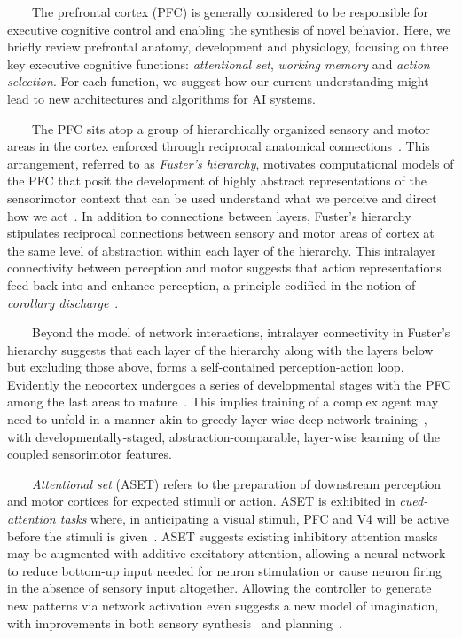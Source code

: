 \documentclass[letterpaper,11pt]{article}
\begin{document}
\begin{center}
  \begin{tcolorbox}[breakable,sharp corners=all,coltitle=black,colbacktitle=white,
    width=\textwidth,boxsep=5pt,left=5pt,right=5pt,
    title={\textbf{Box C: Hierarchy, Abstraction and Executive Control}}]
    
~~~~The prefrontal cortex (PFC) is generally considered to be responsible for executive cognitive control and enabling the synthesis of novel behavior. Here, we briefly review prefrontal anatomy, development and physiology, focusing on three key executive cognitive functions: {\it{attentional set}}, {\it{working memory}} and {\it{action selection}}. For each function, we suggest how our current understanding might lead to new architectures and algorithms for AI systems.

~~~~The PFC sits atop a group of hierarchically organized sensory and motor areas in the cortex enforced through reciprocal anatomical connections~\cite{FusterPREFRONTAL-CORTEX-15}. This arrangement, referred to as {\it{Fuster’s hierarchy}}, motivates computational models of the PFC that posit the development of highly abstract representations of the sensorimotor context that can be used understand what we perceive and direct how we act~\cite{BotvinickPTRS_B-07}. In addition to connections between layers, Fuster’s hierarchy stipulates reciprocal connections between sensory and motor areas of cortex at the same level of abstraction within each layer of the hierarchy. This intralayer connectivity between perception and motor suggests that action representations feed back into and enhance perception, a principle codified in the notion of {\it{corollary discharge}}~\cite{mccloskey2011corollary}.

~~~~Beyond the model of network interactions, intralayer connectivity in Fuster's hierarchy suggests that each layer of the hierarchy along with the layers below but excluding those above, forms a self-contained perception-action loop. Evidently the neocortex undergoes a series of developmental stages with the PFC among the last areas to mature~\cite{guillery2005postnatal}. This implies training of a complex agent may need to unfold in a manner akin to greedy layer-wise deep network training~\cite{BengioetalNIPS-07,belilovsky2018greedy}, with developmentally-staged, abstraction-comparable, layer-wise learning of the coupled sensorimotor features.

~~~~{\it{Attentional set}} (ASET) refers to the preparation of downstream perception and motor cortices for expected stimuli or action. ASET is exhibited in {\it{cued-attention tasks}} where, in anticipating a visual stimuli, PFC and V4 will be active before the stimuli is given~\cite{sylvester2009anticipatory}. ASET suggests existing inhibitory attention masks may be augmented with additive excitatory attention, allowing a neural network to reduce bottom-up input needed for neuron stimulation or cause neuron firing in the absence of sensory input altogether. Allowing the controller to generate new patterns via network activation even suggests a new model of imagination, with improvements in both sensory synthesis~\cite{GregoretalCoRR-15} and planning~\cite{PascanuetalCoRR-17}.


\end{tcolorbox}
\end{center}
\end{document}
